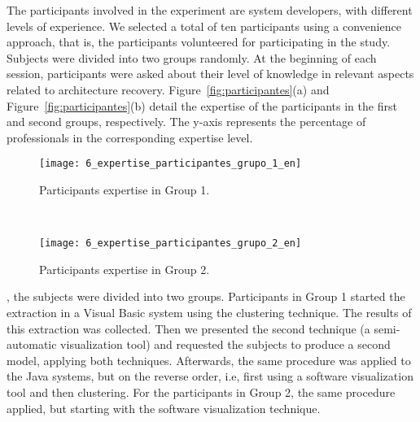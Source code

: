 
The participants involved in the experiment are 
system developers, with different levels of experience. We selected a total of ten 
participants using a convenience approach, that is, the participants volunteered for participating 
in the study. Subjects were divided into two groups randomly.
At the beginning of each session, 
participants were asked about their level of 
knowledge in relevant aspects related to architecture recovery. Figure~\ref{fig:participantes}(a) and Figure~\ref{fig:participantes}(b) 
detail the expertise of the participants in the first and second groups, respectively. 
The y-axis represents the percentage of professionals in the corresponding expertise level.

\begin{figure*}[t!]
 \begin{subfigure}[t]{0.5\textwidth}
	\centering
	\texttt{[image: 6\_expertise\_participantes\_grupo\_1\_en]}
	\caption{Participants expertise in Group 1.}
 \end{subfigure}
 ~
 \begin{subfigure}[t]{0.5\textwidth}
	\centering
	\texttt{[image: 6\_expertise\_participantes\_grupo\_2\_en]}
	\caption{Participants expertise in Group 2.}
 \end{subfigure}
\caption{Expertise of the participants.}
\label{fig:participantes}
\end{figure*}



, the subjects were divided into two groups. 
Participants in Group 1 started the extraction in a Visual Basic system 
using the clustering technique. The results of this extraction was collected. Then 
we presented the second technique (a semi-automatic visualization tool) 
and requested the subjects to produce a second model, 
applying both techniques. Afterwards, the same procedure was applied to the Java systems, 
but on the reverse order, i.e, first using a software visualization tool and then clustering. 
For the participants in Group 2, the same procedure applied, but starting with the 
software visualization technique.

